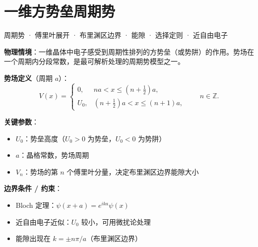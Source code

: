 
\section{一维方势垒周期势}
\label{sec:1d-periodic-square-well}

\begin{tipbox}[关键词标签]
周期势 · 傅里叶展开 · 布里渊区边界 · 能隙 · 选择定则 · 近自由电子
\end{tipbox}

\begin{modelbox}[模型：一维周期方势垒]
\textbf{物理情境}：一维晶体中电子感受到周期性排列的方势垒（或势阱）的作用。势场在一个周期内分段常数，是最可解析处理的周期势模型之一。

\textbf{势场定义}（周期 $a$）：
\[
V(x)=\begin{cases}
0, & na<x\le(n+\tfrac{1}{2})a,\\
U_0, & (n+\tfrac{1}{2})a<x\le(n+1)a,
\end{cases}\qquad n\in\mathbb{Z}.
\]

\textbf{关键参数}：
\begin{itemize}[nosep]
    \item $U_0$：势垒高度（$U_0>0$ 为势垒，$U_0<0$ 为势阱）
    \item $a$：晶格常数，势场周期
    \item $V_n$：势场的第 $n$ 个傅里叶分量，决定布里渊区边界能隙大小
\end{itemize}

\textbf{边界条件 / 约束}：
\begin{itemize}[nosep]
    \item Bloch 定理：$\psi(x+a)=e^{ika}\psi(x)$
    \item 近自由电子近似：$U_0$ 较小，可用微扰论处理
    \item 能隙出现在 $k=\pm n\pi/a$（布里渊区边界）
\end{itemize}
\end{modelbox}

